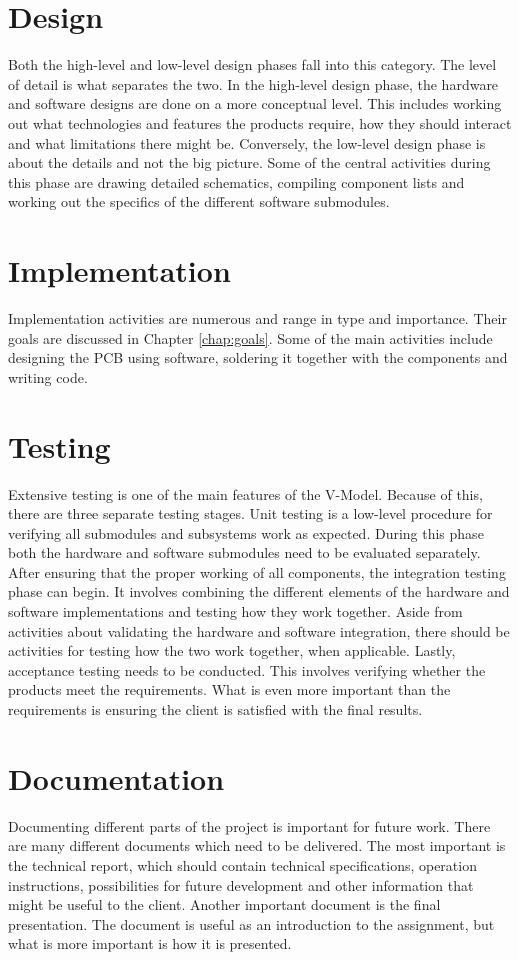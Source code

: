\documentclass{report}
\begin{document}
	\section{Design}
	Both the high-level and low-level design phases fall into this category. The level of detail is what separates the two. In the high-level design phase, the hardware and software designs are done on a more conceptual level. This includes working out what technologies and features the products require, how they should interact and what limitations there might be. Conversely, the low-level design phase is about the details and not the big picture. Some of the central activities during this phase are drawing detailed schematics, compiling component lists and working out the specifics of the different software submodules. 

	\section{Implementation}
	Implementation activities are numerous and range in type and importance. Their goals are discussed in Chapter \ref{chap:goals}. Some of the main activities include designing the PCB using software, soldering it together with the components and writing code.
	
	\section{Testing}
	Extensive testing is one of the main features of the V-Model. Because of this, there are three separate testing stages. Unit testing is a low-level procedure for verifying all submodules and subsystems work as expected. During this phase both the hardware and software submodules need to be evaluated separately. After ensuring that the proper working of all components, the integration testing phase can begin. It involves combining the different elements of the hardware and software implementations and testing how they work together. Aside from activities about validating the hardware and software integration, there should be activities for testing how the two work together, when applicable. Lastly, acceptance testing needs to be conducted. This involves verifying whether the products meet the requirements. What is even more important than the requirements is ensuring the client is satisfied with the final results.
	
	\section{Documentation}
	Documenting different parts of the project is important for future work. There are many different documents which need to be delivered. The most important is the technical report, which should contain technical specifications, operation instructions, possibilities for future development and other information that might be useful to the client. Another important document is the final presentation. The document is useful as an introduction to the assignment, but what is more important is how it is presented. 
	
\end{document}
